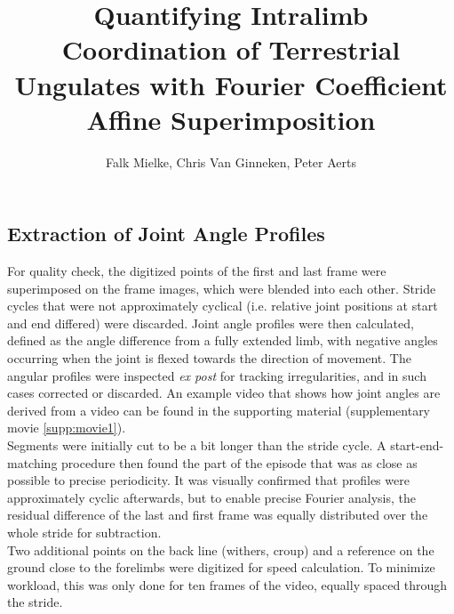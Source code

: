 \documentclass[9pt,twoside,lineno]{pnas-new}
\title{Quantifying Intralimb Coordination of Terrestrial Ungulates with Fourier Coefficient Affine Superimposition}
\author{Falk Mielke, Chris Van Ginneken, Peter Aerts}
\begin{document}

\maketitle

\SItext



\subsection{Extraction of Joint Angle Profiles}\label{apdx:digitization}
For quality check, the digitized points of the first and last frame were superimposed on the frame images, which were blended into each other. 
Stride cycles that were not approximately cyclical (i.e. relative joint positions at start and end differed) were discarded. 
Joint angle profiles were then calculated, defined as the angle difference from a fully extended limb, with negative angles occurring when the joint is flexed towards the direction of movement. 
The angular profiles were inspected \textit{ex post} for tracking irregularities, and in such cases corrected or discarded. 
An example video that shows how joint angles are derived from a video can be found in the supporting material (supplementary movie \ref{supp:movie1}).
\\Segments were initially cut to be a bit longer than the stride cycle. 
A start-end-matching procedure then found the part of the episode that was as close as possible to precise periodicity. 
It was visually confirmed that profiles were approximately cyclic afterwards, but to enable precise Fourier analysis, the residual difference of the last and first frame was equally distributed over the whole stride for subtraction. 
\\Two additional points on the back line (withers, croup) and a reference on the ground close to the forelimbs were digitized for speed calculation. 
To minimize workload, this was only done for ten frames of the video, equally spaced through the stride. 
\end{document}
